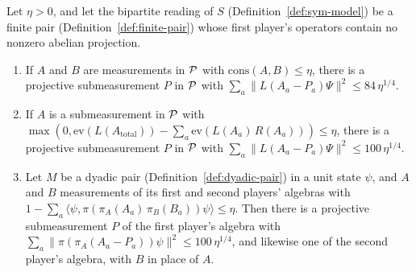 \begin{lemma}
\label{lem:co-orthonormalization}
\leanok
Let $\eta > 0$, and let the bipartite reading of $S$ (Definition~\ref{def:sym-model}) be a finite
pair (Definition~\ref{def:finite-pair}) whose first player's operators contain no nonzero abelian
projection.
\begin{enumerate}
  \item If $A$ and $B$ are measurements in $\cal{P}$ with $\mathrm{cons}(A, B) \leq \eta$, there
    is a projective submeasurement $P$ in $\cal{P}$ with $\sum_a \| L(A_a - P_a) \Psi \|^2 \leq 84\,
    \eta^{1/4}$.
  \item If $A$ is a submeasurement in $\cal{P}$ with $\max(0, \mathrm{ev}(L(A_{\mathrm{total}})) -
    \sum_a \mathrm{ev}(L(A_a)\, R(A_a))) \leq \eta$, there is a projective submeasurement $P$ in
    $\cal{P}$ with $\sum_a \| L(A_a - P_a) \Psi \|^2 \leq 100\, \eta^{1/4}$.
  \item Let $M$ be a dyadic pair (Definition~\ref{def:dyadic-pair}) in a unit state $\psi$, and $A$
    and $B$ measurements of its first and second players' algebras with $1 - \sum_a \langle \psi,
    \pi(\pi_A(A_a)\, \pi_B(B_a)) \psi \rangle \leq \eta$. Then there is a projective submeasurement
    $P$ of the first player's algebra with $\sum_a \| \pi(\pi_A(A_a - P_a)) \psi \|^2 \leq 100\,
    \eta^{1/4}$, and likewise one of the second player's algebra, with $B$ in place of $A$.
\end{enumerate}
\end{lemma}

